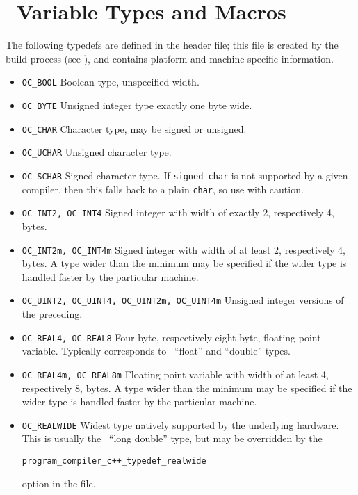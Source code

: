 \chapter{\OOMMF\ Variable Types and Macros}\label{sec:vartypes}
The following typedefs are defined in the
 header file; this file is
created by the  build process (see
), and contains platform and machine
specific information.
\newcommand{\gbs}{\hspace{0.5em}}
\begin{itemize}
\item{\texttt{OC\_BOOL}} \gbs Boolean type, unspecified width.
\item{\texttt{OC\_BYTE}} \gbs Unsigned integer type exactly one byte wide.
\item{\texttt{OC\_CHAR}} \gbs Character type, may be signed or unsigned.
\item{\texttt{OC\_UCHAR}} \gbs Unsigned character type.
\item{\texttt{OC\_SCHAR}} \gbs Signed character type.  If \texttt{signed char}
  is not supported by a given compiler, then this falls back to a
  plain \texttt{char}, so use with caution.
\item{\texttt{OC\_INT2, OC\_INT4}} \gbs Signed integer with width of
  exactly 2, respectively 4, bytes.
\item{\texttt{OC\_INT2m, OC\_INT4m}} \gbs Signed integer with width of
  at least 2, respectively 4, bytes.  A type wider than the minimum
  may be specified if the wider type is handled faster by the
  particular machine.
\item{\texttt{OC\_UINT2, OC\_UINT4, OC\_UINT2m, OC\_UINT4m}} \gbs Unsigned
  integer versions of the preceding.
\item{\texttt{OC\_REAL4, OC\_REAL8}} \gbs Four byte, respectively eight
  byte, floating point variable.  Typically corresponds to \Cplusplus\
  ``float'' and ``double'' types.
\item{\texttt{OC\_REAL4m, OC\_REAL8m}} \gbs Floating point variable with
  width of at least 4, respectively 8, bytes.  A type wider than the minimum
  may be specified if the wider type is handled faster by the
  particular machine.
\item{\texttt{OC\_REALWIDE}} \gbs Widest type natively supported by the
  underlying hardware.  This is usually the \Cplusplus\ ``long
  double'' type, but may be overridden by the
\begin{center}
  \texttt{program\_compiler\_c++\_typedef\_realwide}
\end{center}
  option in the  file.
\end{itemize}

